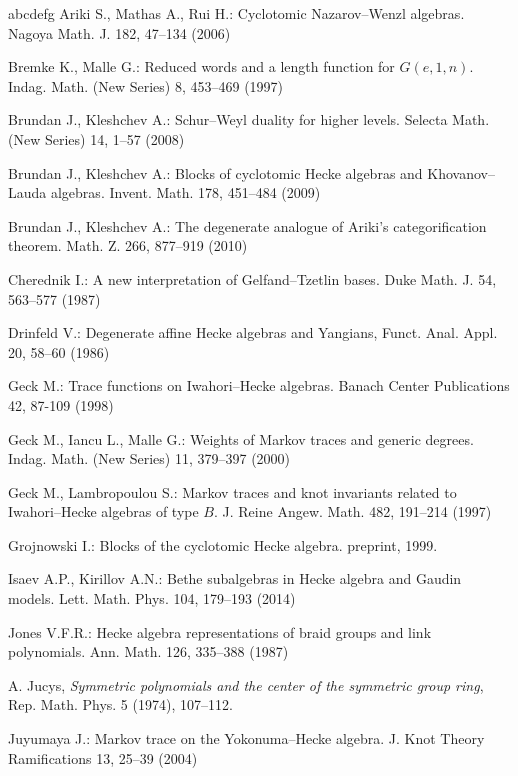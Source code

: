 \documentclass[a4paper, oneside]{amsart}
\numberwithin{equation}{section}
\theoremstyle{definition}
\theoremstyle{remark}
\begin{document}
\begin{thebibliography}{abcdefg}
  Ariki S.,  Mathas A.,  Rui H.: Cyclotomic Nazarov--Wenzl algebras. Nagoya Math. J. 182,  47--134 (2006)

  Bremke K.,   Malle G.: Reduced words and a length function for $G(e, 1, n)$. Indag. Math. (New Series) 8, 453--469 (1997)

 Brundan J.,  Kleshchev  A.: Schur--Weyl duality for higher levels. Selecta Math. (New Series) 14, 1--57 (2008)

Brundan J.,  Kleshchev  A.: Blocks of cyclotomic Hecke algebras and Khovanov--Lauda algebras. Invent. Math. 178, 451--484 (2009)

Brundan J.,  Kleshchev  A.: The degenerate analogue of Ariki's categorification theorem. Math. Z. 266, 877--919 (2010)

  Cherednik I.: A new interpretation of Gelfand--Tzetlin bases. Duke Math. J. 54, 563--577 (1987)

  Drinfeld V.: Degenerate affine Hecke algebras and Yangians, Funct. Anal. Appl. 20, 58--60 (1986)

  Geck M.: Trace functions on Iwahori--Hecke algebras.  Banach Center Publications 42, 87-109 (1998)

  Geck M.,  Iancu L.,   Malle G.: Weights of Markov traces and generic degrees. Indag. Math. (New Series) 11, 379--397 (2000)

 Geck M.,  Lambropoulou S.:  Markov traces and knot invariants related to Iwahori--Hecke algebras of type $B$. J. Reine Angew. Math. 482, 191--214  (1997)

 Grojnowski  I.:  Blocks of the cyclotomic Hecke algebra. preprint, 1999.

 Isaev A.P.,  Kirillov A.N.:  Bethe subalgebras in Hecke algebra and Gaudin models. Lett. Math. Phys. 104, 179--193  (2014)


  Jones V.F.R.: Hecke algebra representations of braid groups and link polynomials. Ann. Math. 126, 335--388 (1987)

 A. Jucys, \emph{Symmetric polynomials and the center of the symmetric group ring}, Rep. Math. Phys. 5 (1974), 107--112.

 Juyumaya J.:  Markov trace on the Yokonuma--Hecke algebra. J. Knot Theory Ramifications  13, 25--39 (2004)


\end{thebibliography}
\end{document}
